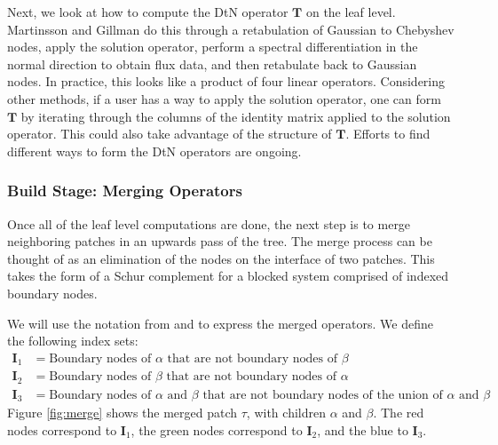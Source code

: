 Next, we look at how to compute the DtN operator $\textbf{T}$ on the leaf level. Martinsson and Gillman do this through a retabulation of Gaussian to Chebyshev nodes, apply the solution operator, perform a spectral differentiation in the normal direction to obtain flux data, and then retabulate back to Gaussian nodes. In practice, this looks like a product of four linear operators. Considering other methods, if a user has a way to apply the solution operator, one can form $\textbf{T}$ by iterating through the columns of the identity matrix applied to the solution operator. This could also take advantage of the structure of $\textbf{T}$. Efforts to find different ways to form the DtN operators are ongoing.

\subsubsection{Build Stage: Merging Operators}

Once all of the leaf level computations are done, the next step is to merge neighboring patches in an upwards pass of the tree. The merge process can be thought of as an elimination of the nodes on the interface of two patches. This takes the form of a Schur complement for a blocked system comprised of indexed boundary nodes.

We will use the notation from \citep{martinsson2015hierarchical} and \citep{gillman2014direct} to express the merged operators. We define the following index sets:
\begin{align*}
    \textbf{I}_1 &= \text{Boundary nodes of } \alpha \text{ that are not boundary nodes of } \beta \\
    \textbf{I}_2 &= \text{Boundary nodes of } \beta \text{ that are not boundary nodes of } \alpha \\
    \textbf{I}_3 &= \text{Boundary nodes of } \alpha \text{ and } \beta \text{ that are not boundary nodes of the union of } \alpha \text{ and } \beta
\end{align*}
Figure \ref{fig:merge} shows the merged patch $\tau$, with children $\alpha$ and $\beta$. The red nodes correspond to $\textbf{I}_1$, the green nodes correspond to $\textbf{I}_2$, and the blue to $\textbf{I}_3$.

